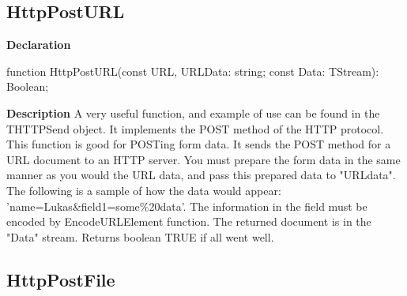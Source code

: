 \documentclass{report}
\newif\ifpdf
\begin{document}
\subsection*{HttpPostURL}
\fi
\label{httpsend-HttpPostURL}
\begin{list}{}{
\setlength{\itemindent}{0cm}
\setlength{\listparindent}{0cm}
\setlength{\leftmargin}{\evensidemargin}
\addtolength{\leftmargin}{\tmplength}
\settowidth{\labelsep}{X}
\addtolength{\leftmargin}{\labelsep}
\setlength{\labelwidth}{\tmplength}
}
\item[\textbf{Declaration}\hfill]
\ifpdf
\begin{flushleft}
\fi
\begin{ttfamily}
function HttpPostURL(const URL, URLData: string; const Data: TStream): Boolean;\end{ttfamily}

\ifpdf
\end{flushleft}
\fi

\par
\item[\textbf{Description}]
A very useful function, and example of use can be found in the THTTPSend object. It implements the POST method of the HTTP protocol. This function is good for POSTing form data. It sends the POST method for a URL document to an HTTP server. You must prepare the form data in the same manner as you would the URL data, and pass this prepared data to "URLdata". The following is a sample of how the data would appear: 'name=Lukas{\&}field1=some{\%}20data'. The information in the field must be encoded by EncodeURLElement function. The returned document is in the "Data" stream. Returns boolean TRUE if all went well.

\end{list}
\ifpdf
\subsection*{\large{\textbf{HttpPostFile}}\normalsize\hspace{1ex}\hrulefill}
\else
\end{document}

